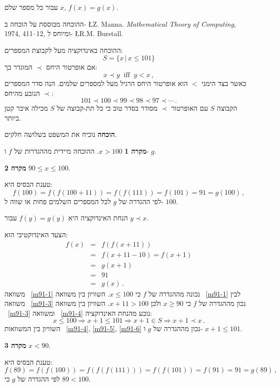 \newpage

\begin{theorem}
עבור כל מספר שלם
$x$, $f(x) = g(x)$.
\end{theorem}
ההוכחה מבוססת על הוכחה ב-%
\L{Z. Manna. \textit{Mathematical Theory of Computing}, 1974, 411--12},
ומיוחס ל-%
\L{R.M. Burstall}.

ההוכחה באינדוקציה מעל לקבוצת המספרים:
\[
S=\{x\,|\,x\leq 101\}
\]
אם אופרטור היחס
$\prec$
המוגדר כך:
\[
x \prec y \;\; \textrm{iff}\;\; y < x\,,
\]
כאשר בצד הימני 
$<$
הוא אופרטור היחס הרגיל מעל למספרים שלמים. הנה סדר המספרים הנובע מהיחס
$\prec$:
\[
101 \prec 100 \prec 99 \prec 98 \prec 97 \prec \cdots\,.
\]
הקבוצה
$S$
עם האופרטור
$\prec$
מסודר בסדר טוב כי כל תת-קבוצה של
$S$
מכילה איבר קטן ביותר.

\noindent\textbf{הוכחה}
נוכיח את המשפט בשלושה חלקים.

\noindent\textbf{מקרה 1}  $x > 100$.
ההוכחה מיידית מההגדרות של 
$f$
ו-
$g$.

\noindent\textbf{מקרה 2} 
$90\leq x \leq 100$.

\noindent{}%
טענת הבסיס היא:
\[
f(100) = f(f(100+11)) = f(f(111)) = f(101) = 91 = g(100)\,,
\]
לפי ההגדרה של
$g$
לכל המספרים השלמים פחות או שווה ל-%
$100$.

\noindent{}%
הנחת האינדוקציה היא
$f(y) = g(y)$
עבור
$y\prec x$.

\noindent{}%
הצעד האינדוקטיבי הוא:
\vspace*{-1ex}
\begin{eqnarray}
f(x) &=& f(f(x+11))\label{m91-1}\\
&=& f(x+11-10)= f(x+1)\label{m91-3}\\
&=& g(x+1)\label{m91-4}\\
&=& 91\label{m91-5}\\
&=& g(x)\label{m91-6}\,.
\end{eqnarray}
משוואה%
~\ref{m91-1}
נכונה מההגדרה של
$f$
כי
$x\leq 100$.
השוויון בין משוואה%
~\ref{m91-1}
לבין משוואה%
~\ref{m91-3}
נכון מההגדרה של
$f$
כי
$x \geq 90$
ולכן
$x+11 > 100$.
השוויון בין משוואה%
~\ref{m91-3}
ומשוואה%
~\ref{m91-4}
נובע מהנחת האינדוקציה:
\[
x\leq 100 \Rightarrow x+1 \leq 101 \Rightarrow x+1\in S \Rightarrow x+1\prec x\,.
\]
השוויון בין המשוואות%
~\ref{m91-4}, \ref{m91-5}, \ref{m91-6}
נכון מההגדרה של 
$g$
ו-%
$x+1 \leq 101$.

\newpage

\noindent\textbf{מקרה 3} $x< 90$.

\noindent{}%
טענת הבסיס היא:
\[
f(89) = f(f(100)) = f(f(f(111))) = f(f(101)) = f(91) = 91 = g(89)\,,
\]
לפי ההגדרה של
$g$
כי
$89<100$.


